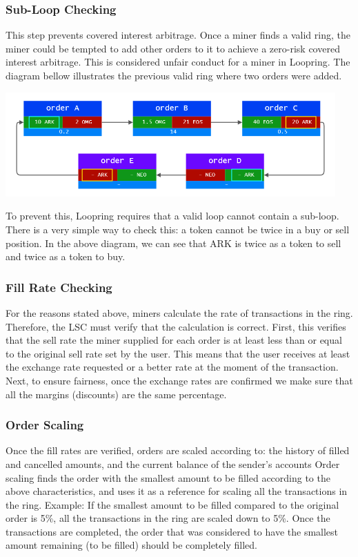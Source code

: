 \documentclass[UTF8,nofonts]{article}
\makeatletter
\newenvironment{figurehere}
 {\def\@captype{figure}}
 {}
\makeatother
\begin{document}
\subsubsection{Sub-Loop Checking}
This step prevents covered interest arbitrage. Once a miner finds a valid ring, the miner could be tempted to add other orders to it to achieve a zero-risk covered interest arbitrage. This is considered unfair conduct for a miner in Loopring.
The diagram bellow illustrates the previous valid ring where two orders were added.
\begin{center}
\begin{figurehere}
\includegraphics[height=4cm]{images/order-ring-sub-loop.png}
\label{fig: Loopringrotocol}
\end{figurehere}
\end{center}
To prevent this, Loopring requires that a valid loop cannot contain a sub-loop. There is a very simple way to check this: a token cannot be twice in a buy or sell position. In the above diagram, we can see that ARK is twice as a token to sell and twice as a token to buy.

\subsubsection{Fill Rate Checking}

For the reasons stated above, miners calculate the rate of transactions in the ring. Therefore, the LSC must verify that the calculation is correct.
First, this verifies that the sell rate the miner supplied for each order is at least less than or equal to the original sell rate set by the user. This means that the user receives at least the exchange rate requested or a better rate at the moment of the transaction.
Next, to ensure fairness, once the exchange rates are confirmed we make sure that all the margins (discounts) are the same percentage.

\subsubsection{Order Scaling}
Once the fill rates are verified, orders are scaled according to: the history of filled and cancelled amounts, and the current balance of the sender’s accounts
Order scaling finds the order with the smallest amount to be filled according to the above characteristics, and uses it as a reference for scaling all the transactions in the ring.
Example: If the smallest amount to be filled compared to the original order is 5\%, all the transactions in the ring are scaled down to 5\%. Once the transactions are completed, the order that was considered to have the smallest amount remaining (to be filled) should be completely filled.
\end{document}
